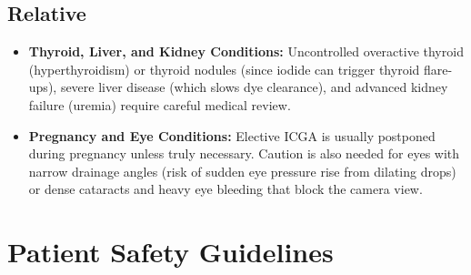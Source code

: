 \subsection{Relative}

\begin{itemize}
    \item \textbf{Thyroid, Liver, and Kidney Conditions:} Uncontrolled overactive thyroid (hyperthyroidism) or thyroid nodules (since iodide can trigger thyroid flare-ups), severe liver disease (which slows dye clearance), and advanced kidney failure (uremia) require careful medical review.
    \item \textbf{Pregnancy and Eye Conditions:} Elective ICGA is usually postponed during pregnancy unless truly necessary. Caution is also needed for eyes with narrow drainage angles (risk of sudden eye pressure rise from dilating drops) or dense cataracts and heavy eye bleeding that block the camera view.
\end{itemize}

\section{Patient Safety Guidelines}

